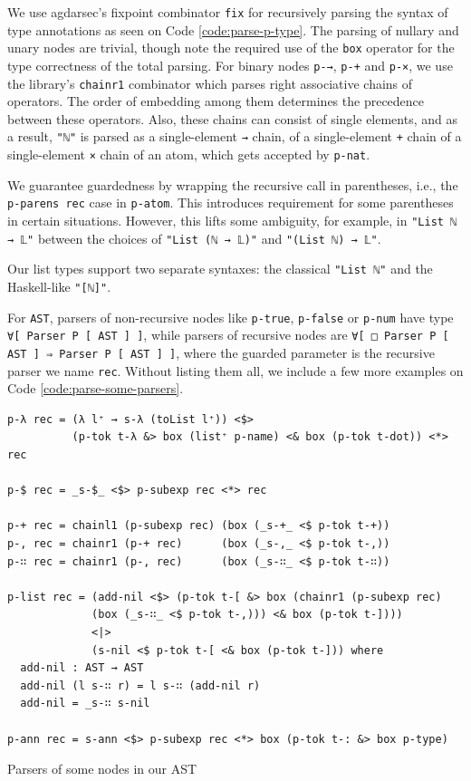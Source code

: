 We use agdarsec's fixpoint combinator \verb$fix$ for recursively parsing the syntax of type annotations as seen on Code \ref{code:parse-p-type}. The parsing of nullary and unary nodes are trivial, though note the required use of the \verb$box$ operator for the type correctness of the total parsing. For binary nodes \verb$p-→$, \verb$p-+$ and \verb$p-×$, we use the library's \verb$chainr1$ combinator which parses right associative chains of operators. The order of embedding among them determines the precedence between these operators. Also, these chains can consist of single elements, and as a result, \verb$"ℕ"$ is parsed as a single-element \verb$→$ chain, of a single-element \verb$+$ chain of a single-element \verb$×$ chain of an atom, which gets accepted by \verb$p-nat$.

We guarantee guardedness by wrapping the recursive call in parentheses, i.e., the \verb$p-parens rec$ case in \verb$p-atom$. This introduces requirement for some parentheses in certain situations. However, this lifts some ambiguity, for example, in \verb$"List ℕ → 𝕃"$ between the choices of \verb$"List (ℕ → 𝕃)"$ and \verb$"(List ℕ) → 𝕃"$.

Our list types support two separate syntaxes: the classical \verb$"List ℕ"$ and the Haskell-like \verb$"[ℕ]"$.

For \verb$AST$, parsers of non-recursive nodes like \verb$p-true$, \verb$p-false$ or \verb$p-num$ have type \verb$∀[ Parser P [ AST ] ]$, while parsers of recursive nodes are \verb$∀[ □ Parser P [ AST ] ⇒ Parser P [ AST ] ]$, where the guarded parameter is the recursive parser we name \verb$rec$. Without listing them all, we include a few more examples on Code \ref{code:parse-some-parsers}.

\begin{listing}[H]
\begin{verbatim}
p-λ rec = (λ l⁺ → s-λ (toList l⁺)) <$>
          (p-tok t-λ &> box (list⁺ p-name) <& box (p-tok t-dot)) <*> rec

p-$ rec = _s-$_ <$> p-subexp rec <*> rec

p-+ rec = chainl1 (p-subexp rec) (box (_s-+_ <$ p-tok t-+))
p-, rec = chainr1 (p-+ rec)      (box (_s-,_ <$ p-tok t-,))
p-∷ rec = chainr1 (p-, rec)      (box (_s-∷_ <$ p-tok t-∷))

p-list rec = (add-nil <$> (p-tok t-[ &> box (chainr1 (p-subexp rec)
             (box (_s-∷_ <$ p-tok t-,))) <& box (p-tok t-])))
             <|>
             (s-nil <$ p-tok t-[ <& box (p-tok t-])) where
  add-nil : AST → AST
  add-nil (l s-∷ r) = l s-∷ (add-nil r)
  add-nil = _s-∷ s-nil

p-ann rec = s-ann <$> p-subexp rec <*> box (p-tok t-: &> box p-type)
\end{verbatim}
\caption{Parsers of some nodes in our AST}
\label{code:parse-some-parsers}
\end{listing}

